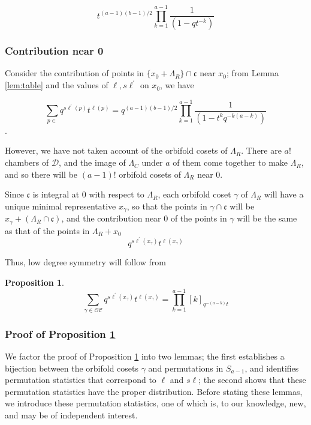 \documentclass{amsart}[12pt]
\theoremstyle{definition}
\newtheorem{proposition}[dummy]{Proposition}
\newcommand{\OC}{\mathcal{OC}}
\newcommand{\sk}{s\ell}
\newcommand{\cone}{\mathfrak{c}}
\newcommand{\dominant}{\mathcal{D}}
\begin{document}
$$t^{(a-1)(b-1)/2}\prod_{k=1}^{a-1}\frac{1}{(1-qt^{-k})}$$


\subsubsection{Contribution near 0}
Consider the contribution of points in $\{x_0+\Lambda_R\}\cap\cone$ near $x_0$; from Lemma \ref{lem:table} and the values of $\ell, \sk^\prime$ on $x_0$, we have

$$\sum_{p\in } q^{\sk^\prime(p)}t^{\ell(p)}=q^{(a-1)(b-1)/2}\prod_{k=1}^{a-1} \frac{1}{(1-t^kq^{-k(a-k)})}$$.

However, we have not taken account of the orbifold cosets of $\Lambda_R$.  There are $a!$ chambers of $\dominant$, and the image of $\Lambda_C$ under $a$ of them come together to make $\Lambda_R$, and so there will be $(a-1)!$ orbifold cosets of $\Lambda_R$ near $0$.  

Since $\cone$ is integral at $0$ with respect to $\Lambda_R$, each orbifold coset $\gamma$ of $\Lambda_R$ will have a unique minimal representative $x_\gamma$, so that the points in $\gamma\cap\cone$ will be $x_\gamma+\left(\Lambda_R\cap \cone\right)$,  and the contribution near $0$ of the points in $\gamma$ will be the same as that of the points in $\Lambda_R+x_0$
$$q^{\sk^\prime(x_\gamma)}t^{\ell(x_\gamma)}$$

Thus, low degree symmetry will follow from
\begin{proposition} \label{prop:orbcosets}
$$\sum_{\gamma\in\OC} q^{\sk^\prime(x_\gamma)}t^{\ell(x_\gamma)}=\prod_{k=1}^{a-1}[k]_{q^{-(a-k)}t}$$ 

\end{proposition}
  
\subsubsection{Proof of Proposition \ref{prop:orbcosets}}

We factor the proof of Proposition \ref{prop:orbcosets} into two lemmas; the first establishes a bijection between the orbifold cosets $\gamma$ and permutations in $S_{a-1}$, and identifies permutation statistics that correspond to $\ell$ and $\sk$; the second shows that these permutation statistics have the proper distribution.  Before stating these lemmas, we introduce these permutation statistics, one of which is, to our knowledge, new, and may be of independent interest.
\end{document}
